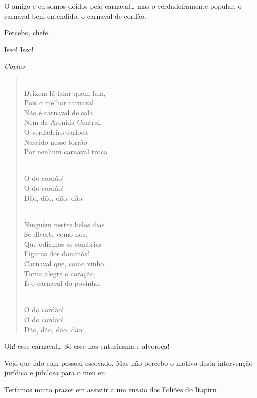 \begin{linenumbers}
 O amigo e eu somos
doidos pelo carnaval\ldots{} mas o verdadeiramente popular, o carnaval bem
entendido, o carnaval de cordão.

 Percebo, chefe.

 Isso! Isso!

{\smallskip\raggedleft\itshape Coplas\par}
\begin{verse}

\\
Deixem lá falar quem fala,\\
Pois o melhor carnaval\\
Não é carnaval de sala\\
Nem da Avenida Central.\\
O verdadeiro carioca\\
Nascido nesse torrão\\
Por nenhum carnaval troca


 \\
O do cordão!\\
O do cordão!\\
Dão, dão, dão, dão!


\\
Ninguém nestes belos dias\\
Se diverte como nós,\\
Que odiamos as sombrias\\
Figuras dos dominós!\\
Carnaval que, como vinho,\\
Torna alegre o coração,\\
É o carnaval do povinho,


 \\
O do cordão!\\
O do cordão!\\
Dão, dão, dão, dão
\end{verse}

  
Oh! esse carnaval\ldots{} Só esse nos
entusiasma e alvoroça!

 Vejo que falo
com pessoal escovado. Mas não percebo o motivo desta
intervenção jurídica e jubilosa para o meu eu.

 Teríamos muito
prazer em assistir a um ensaio dos Foliões
do Itapiru.


\end{linenumbers}
